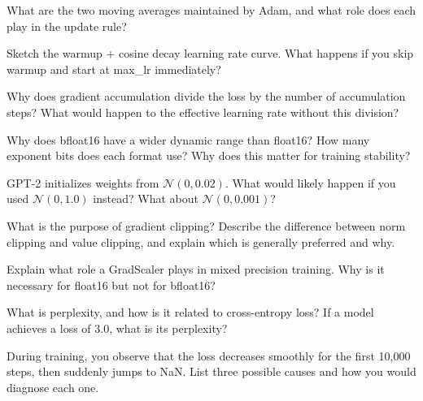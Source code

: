 \begin{reviewquestion}[4]
  What are the two moving averages maintained by Adam, and what role does each play in the update rule?
\end{reviewquestion}

\begin{reviewquestion}[5]
  Sketch the warmup + cosine decay learning rate curve. What happens if you skip warmup and start at max\_lr immediately?
\end{reviewquestion}

\begin{reviewquestion}[6]
  Why does gradient accumulation divide the loss by the number of accumulation steps? What would happen to the effective learning rate without this division?
\end{reviewquestion}

\begin{reviewquestion}[7]
  Why does bfloat16 have a wider dynamic range than float16? How many exponent bits does each format use? Why does this matter for training stability?
\end{reviewquestion}

\begin{reviewquestion}[8]
  GPT-2 initializes weights from $\mathcal{N}(0, 0.02)$. What would likely happen if you used $\mathcal{N}(0, 1.0)$ instead? What about $\mathcal{N}(0, 0.001)$?
\end{reviewquestion}

\begin{reviewquestion}[9]
  What is the purpose of gradient clipping? Describe the difference between norm clipping and value clipping, and explain which is generally preferred and why.
\end{reviewquestion}

\begin{reviewquestion}[10]
  Explain what role a GradScaler plays in mixed precision training. Why is it necessary for float16 but not for bfloat16?
\end{reviewquestion}

\begin{reviewquestion}[11]
  What is perplexity, and how is it related to cross-entropy loss? If a model achieves a loss of 3.0, what is its perplexity?
\end{reviewquestion}

\begin{reviewquestion}[12]
  During training, you observe that the loss decreases smoothly for the first 10,000 steps, then suddenly jumps to NaN. List three possible causes and how you would diagnose each one.
\end{reviewquestion}

